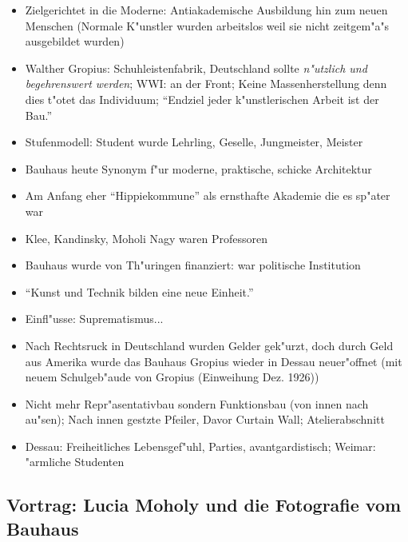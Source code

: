\documentclass[emulatestandardclasses]{scrartcl}
\begin{document}
\begin{itemize}
  \item Zielgerichtet in die Moderne: Antiakademische Ausbildung hin zum neuen Menschen (Normale K"unstler wurden arbeitslos weil sie nicht zeitgem"a"s ausgebildet wurden)
  \item Walther Gropius: Schuhleistenfabrik, Deutschland sollte \emph{n"utzlich und begehrenswert werden}; WWI: an der Front; Keine Massenherstellung denn dies t"otet das Individuum; "`Endziel jeder k"unstlerischen Arbeit ist der Bau."'
  \item Stufenmodell: Student wurde Lehrling, Geselle, Jungmeister, Meister
  \item Bauhaus heute Synonym f"ur moderne, praktische, schicke Architektur
  \item Am Anfang eher "`Hippiekommune"' als ernsthafte Akademie die es sp"ater war
  \item Klee, Kandinsky, Moholi Nagy waren Professoren 
  \item Bauhaus wurde von Th"uringen finanziert: war politische Institution
  \item "`Kunst und Technik bilden eine neue Einheit."'
  \item Einfl"usse: Suprematismus...
  \item Nach Rechtsruck in Deutschland wurden Gelder gek"urzt, doch durch Geld aus Amerika wurde das Bauhaus Gropius wieder in Dessau neuer"offnet (mit neuem Schulgeb"aude von Gropius (Einweihung Dez. 1926)) 
  \item Nicht mehr Repr"asentativbau sondern Funktionsbau (von innen nach au"sen); Nach innen gestzte Pfeiler, Davor Curtain Wall; Atelierabschnitt
  \item Dessau: Freiheitliches Lebensgef"uhl, Parties, avantgardistisch; Weimar: "armliche Studenten
\end{itemize}

\subsection{Vortrag: Lucia Moholy und die Fotografie vom Bauhaus}
\end{document}
